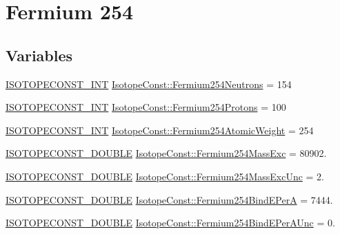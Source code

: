 \hypertarget{group___isotope_const-_fermium-_fm254}{}\section{Fermium 254}
\label{group___isotope_const-_fermium-_fm254}
\subsection*{Variables}
\begin{DoxyCompactItemize}
\item 
\mbox{\hyperlink{group___isotope_const-_macros_ga5f18360b3e99483a35c32d789e62621c}{I\+S\+O\+T\+O\+P\+E\+C\+O\+N\+S\+T\+\_\+\+I\+NT}} \mbox{\hyperlink{group___isotope_const-_fermium-_fm254_gafe78cd40498ce5bdb948afb7f386ea99}{Isotope\+Const\+::\+Fermium254\+Neutrons}} = 154
\item 
\mbox{\hyperlink{group___isotope_const-_macros_ga5f18360b3e99483a35c32d789e62621c}{I\+S\+O\+T\+O\+P\+E\+C\+O\+N\+S\+T\+\_\+\+I\+NT}} \mbox{\hyperlink{group___isotope_const-_fermium-_fm254_ga591d01e8bc2b627974a007912cb52efe}{Isotope\+Const\+::\+Fermium254\+Protons}} = 100
\item 
\mbox{\hyperlink{group___isotope_const-_macros_ga5f18360b3e99483a35c32d789e62621c}{I\+S\+O\+T\+O\+P\+E\+C\+O\+N\+S\+T\+\_\+\+I\+NT}} \mbox{\hyperlink{group___isotope_const-_fermium-_fm254_ga7177017fd6b981c7f8c32481ed08d936}{Isotope\+Const\+::\+Fermium254\+Atomic\+Weight}} = 254
\item 
\mbox{\hyperlink{group___isotope_const-_macros_ga8f45a7272ce02c0b4c65c44636ed719a}{I\+S\+O\+T\+O\+P\+E\+C\+O\+N\+S\+T\+\_\+\+D\+O\+U\+B\+LE}} \mbox{\hyperlink{group___isotope_const-_fermium-_fm254_ga76acac32ded6bdae75aa7101c78c126a}{Isotope\+Const\+::\+Fermium254\+Mass\+Exc}} = 80902.
\item 
\mbox{\hyperlink{group___isotope_const-_macros_ga8f45a7272ce02c0b4c65c44636ed719a}{I\+S\+O\+T\+O\+P\+E\+C\+O\+N\+S\+T\+\_\+\+D\+O\+U\+B\+LE}} \mbox{\hyperlink{group___isotope_const-_fermium-_fm254_ga8251dc71cfe5954902f8e032d7c86094}{Isotope\+Const\+::\+Fermium254\+Mass\+Exc\+Unc}} = 2.
\item 
\mbox{\hyperlink{group___isotope_const-_macros_ga8f45a7272ce02c0b4c65c44636ed719a}{I\+S\+O\+T\+O\+P\+E\+C\+O\+N\+S\+T\+\_\+\+D\+O\+U\+B\+LE}} \mbox{\hyperlink{group___isotope_const-_fermium-_fm254_ga21544952c008a4c2d012f8cdb627772d}{Isotope\+Const\+::\+Fermium254\+Bind\+E\+PerA}} = 7444.
\item 
\mbox{\hyperlink{group___isotope_const-_macros_ga8f45a7272ce02c0b4c65c44636ed719a}{I\+S\+O\+T\+O\+P\+E\+C\+O\+N\+S\+T\+\_\+\+D\+O\+U\+B\+LE}} \mbox{\hyperlink{group___isotope_const-_fermium-_fm254_ga3bd0b5566243e76ccf914009853df1e6}{Isotope\+Const\+::\+Fermium254\+Bind\+E\+Per\+A\+Unc}} = 0.

\end{DoxyCompactItemize}
